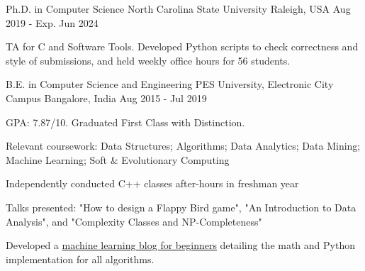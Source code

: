 

\begin{cventries}

  \cventry
    {Ph.D. in Computer Science} %
    {North Carolina State University} %
    {Raleigh, USA} %
    {Aug 2019 - Exp. Jun 2024} %
    {
    	\begin{cvitems}
    		\item {TA for C and Software Tools. Developed Python scripts to check correctness and style of submissions, and held weekly office hours for 56 students.}
    	\end{cvitems}
    }

  \cventry
    {B.E. in Computer Science and Engineering} %
    {PES University, Electronic City Campus} %
    {Bangalore, India} %
    {Aug 2015 - Jul 2019} %
    {
      \begin{cvitems} %
        \item {GPA: 7.87/10. Graduated First Class with Distinction.}
        \item {Relevant coursework: Data Structures; Algorithms; Data Analytics; Data Mining; Machine Learning; Soft \& Evolutionary Computing}
        \item {Independently conducted C++ classes after-hours in freshman year}
        \item {Talks presented: "How to design a Flappy Bird game", "An Introduction to Data Analysis", and "Complexity Classes and NP-Completeness"}
        \item {Developed a \href{www.beginningwithml.wordpress.com}{machine learning blog for beginners} detailing the math and Python implementation for all algorithms.}
      \end{cvitems}
    }

\end{cventries}
